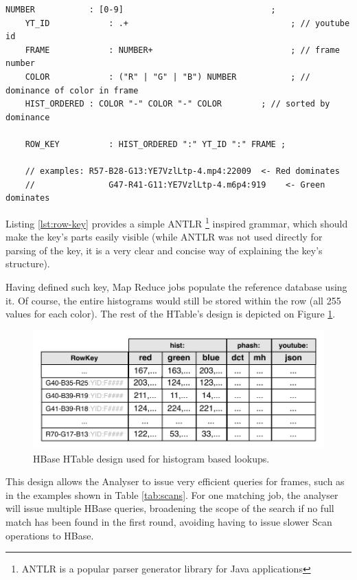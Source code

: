 \begin{lstlisting}[caption={Grammar for the Histogram RowKey. In essence, it contains an encoded colour dominance value, the youtube id of the movie, and frame number.}, label={lst:row-key}]
    NUMBER           : [0-9]                              ;
    YT_ID            : .+                                 ; // youtube id
    FRAME            : NUMBER+                            ; // frame number
    COLOR            : ("R" | "G" | "B") NUMBER           ; // dominance of color in frame
    HIST_ORDERED : COLOR "-" COLOR "-" COLOR        ; // sorted by dominance

    ROW_KEY          : HIST_ORDERED ":" YT_ID ":" FRAME ;
    
    // examples: R57-B28-G13:YE7VzlLtp-4.mp4:22009  <- Red dominates
    //               G47-R41-G11:YE7VzlLtp-4.m6p4:919    <- Green dominates
\end{lstlisting}

Listing \ref{lst:row-key} provides a simple ANTLR \footnote{ANTLR is a popular parser generator library for Java applications} inspired grammar, which should make the key's parts easily visible (while ANTLR was not used directly for parsing of the key, it is a very clear and concise way of explaining the key's structure).

Having defined such key, Map Reduce jobs populate the reference database using it. Of course, the entire histograms would still be stored within the row (all 255 values for each color). The rest of the HTable's design is depicted on Figure \ref{fig:histogram-table}.

\begin{figure}[ch!]
  \centering
  \includegraphics[width=\textwidth]{img/hbase-hashes-table}
  \caption{HBase HTable design used for histogram based lookups.}
  \label{fig:histogram-table}
\end{figure}

This design allows the Analyser to issue very efficient queries for frames, such as in the examples shown in Table \ref{tab:scans}. For one matching job, the analyser will issue multiple HBase queries, broadening the scope of the search if no full match has been found in the first round, avoiding having to issue slower Scan operations to HBase.

